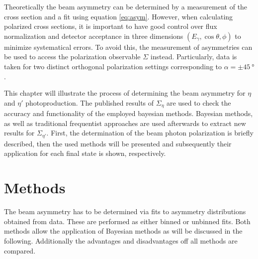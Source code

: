 Theoretically the beam asymmetry can be determined by a measurement of the cross section and a fit using equation \eqref{eq:asym}. However, when calculating polarized cross sections, it is important to have good control over flux normalization and detector acceptance in three dimensions $(E_\gamma,\cos\theta,\phi)$ to minimize systematical errors. To avoid this, the measurement of asymmetries can be used to access the polarization observable $\Sigma$ instead. Particularly, data is taken for two distinct orthogonal polarization settings corresponding to $\alpha=\pm\SI{45}{\degree}$.

This chapter will illustrate the process of determining the beam asymmetry for $\eta$ and $\eta'$ photoproduction. The published results of $\Sigma_{\eta}$ \cite{farahphd,eta} are used to check the accuracy and functionality of the employed bayesian methods. Bayesian methods, as well as traditional frequentist approaches are used afterwards to extract new results for $\Sigma_{\eta'}$. First, the determination of the beam photon polarization is briefly described, then the used methods will be presented and subsequently their application for each final state is shown, respectively.
\section{Methods}
\label{sec:meth}
The beam asymmetry has to be determined via fits to asymmetry distributions obtained from data. These are performed as either binned or unbinned fits. Both methods allow the application of Bayesian methods as will be discussed in the following. Additionally the advantages and disadvantages off all methods are compared.
